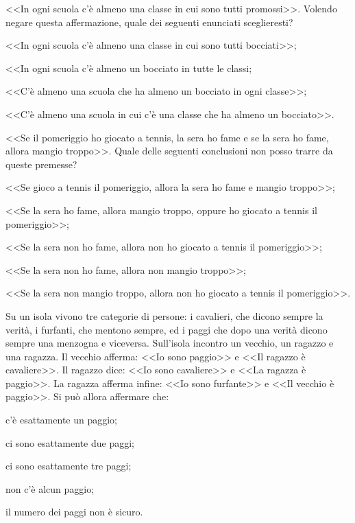 \begin{esercizio}
\label{ese:0.25}
<<In ogni scuola c'è almeno una classe in cui sono tutti promossi>>. Volendo negare questa affermazione, quale dei seguenti enunciati sceglieresti?
\begin{enumeratea}
\item <<In ogni scuola c'è almeno una classe in cui sono tutti bocciati>>;
\item <<In ogni scuola c'è almeno un bocciato in tutte le classi;
\item <<C'è almeno una scuola che ha almeno un bocciato in ogni classe>>;
\item <<C'è almeno una scuola in cui c'è una classe che ha almeno un bocciato>>.
\end{enumeratea}
\end{esercizio}

\begin{esercizio}
\label{ese:0.26}
<<Se il pomeriggio ho giocato a tennis, la sera ho fame e se la sera ho fame, allora mangio troppo>>. Quale delle seguenti conclusioni non posso trarre da queste premesse?
\begin{enumeratea}
\item <<Se gioco a tennis il pomeriggio, allora la sera ho fame e mangio troppo>>;
\item <<Se la sera ho fame, allora mangio troppo, oppure ho giocato a tennis il pomeriggio>>;
\item <<Se la sera non ho fame, allora non ho giocato a tennis il pomeriggio>>;
\item <<Se la sera non ho fame, allora non mangio troppo>>;
\item <<Se la sera non mangio troppo, allora non ho giocato a tennis il pomeriggio>>.
\end{enumeratea}
\end{esercizio}

\begin{esercizio}
\label{ese:0.27}
Su un isola vivono tre categorie di persone: i cavalieri, che dicono sempre la verità, i furfanti, che mentono sempre, ed i paggi che dopo una verità dicono sempre una menzogna e viceversa. Sull'isola incontro un vecchio, un ragazzo e una ragazza. Il vecchio afferma: <<Io sono paggio>> e <<Il ragazzo è cavaliere>>. Il ragazzo dice: <<Io sono cavaliere>> e <<La ragazza è paggio>>. La ragazza afferma infine: <<Io sono furfante>> e <<Il vecchio è paggio>>. Si può allora affermare che:
\begin{enumeratea}
\item c'è esattamente un paggio;
\item ci sono esattamente due paggi;
\item ci sono esattamente tre paggi;
\item non c'è alcun paggio;
\item il numero dei paggi non è sicuro.
\end{enumeratea}
\end{esercizio}

